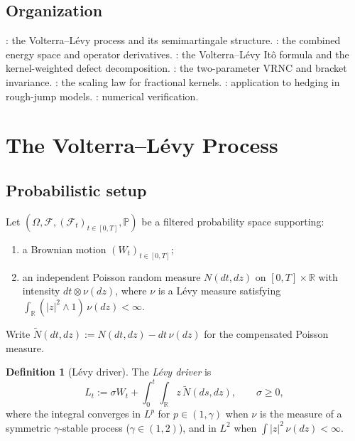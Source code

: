 \documentclass[11pt,a4paper]{article}
\theoremstyle{plain}
\theoremstyle{definition}
\newtheorem{definition}[theorem]{Definition}
\theoremstyle{remark}
\newcommand{\R}{\mathbb{R}}
\newcommand{\PP}{\mathbb{P}}
\newcommand{\F}{\mathcal{F}}
\newcommand{\Ntilde}{\widetilde{N}}
\begin{document}
\subsection{Organization}

: the Volterra--L\'evy process and its
semimartingale structure.
: the combined energy space and operator
derivatives.
: the Volterra--L\'evy It\^o formula and the
kernel-weighted defect decomposition.
: the two-parameter VRNC and bracket
invariance.
: the scaling law for fractional kernels.
: application to hedging in rough-jump models.
: numerical verification.

\section{The Volterra--L\'evy Process}\label{sec:setup}

\subsection{Probabilistic setup}

Let $(\Omega, \F, (\F_t)_{t \in [0,T]}, \PP)$ be a filtered
probability space supporting:
\begin{enumerate}[label=(\roman*)]
\item a Brownian motion $(W_t)_{t \in [0,T]}$;
\item an independent Poisson random measure $N(dt,dz)$ on
  $[0,T] \times \R$ with intensity
  $dt \otimes \nu(dz)$, where $\nu$ is a L\'evy measure
  satisfying $\int_\R (|z|^2 \wedge 1)\,\nu(dz) < \infty$.
\end{enumerate}
Write $\Ntilde(dt,dz) := N(dt,dz) - dt\,\nu(dz)$ for the
compensated Poisson measure.

\begin{definition}[L\'evy driver]\label{def:levy-driver}
The \emph{L\'evy driver} is
\begin{equation}\label{eq:levy-driver}
  L_t := \sigma W_t + \int_0^t\!\!\int_\R z\,\Ntilde(ds,dz),
  \qquad \sigma \geq 0,
\end{equation}
where the integral converges in $L^p$ for $p \in (1,\gamma)$ when
$\nu$ is the measure of a symmetric $\gamma$-stable process
($\gamma \in (1,2)$), and in $L^2$ when
$\int |z|^2\,\nu(dz) < \infty$.
\end{definition}
\end{document}
